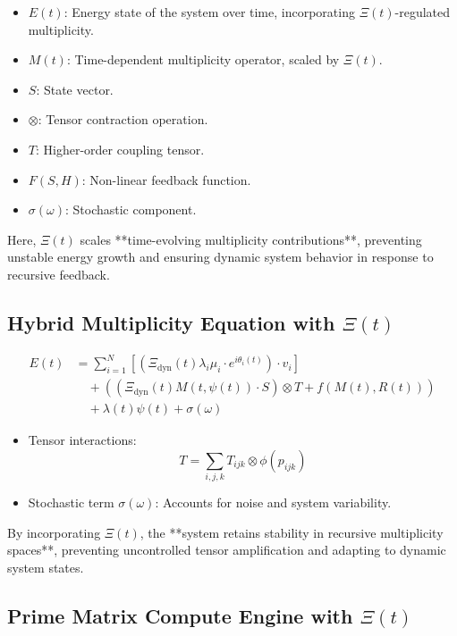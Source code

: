 \documentclass{article}
\theoremstyle{plain}
\begin{document}
\begin{itemize}
\begin{itemize}
    \item \textbf{\( E(t) \)}: Energy state of the system over time, incorporating \(\Xi(t) \)-regulated multiplicity.
    \item \textbf{\( M(t) \)}: Time-dependent multiplicity operator, scaled by \(\Xi(t) \).
    \item \textbf{\( S \)}: State vector.
    \item \textbf{\( \otimes \)}: Tensor contraction operation.
    \item \textbf{\( T \)}: Higher-order coupling tensor.
    \item \textbf{\( F(S, H) \)}: Non-linear feedback function.
    \item \textbf{\( \sigma(\omega) \)}: Stochastic component.
\end{itemize}

Here, \(\Xi(t) \) scales **time-evolving multiplicity contributions**, preventing unstable energy growth and ensuring dynamic system behavior in response to recursive feedback.

\subsection{Hybrid Multiplicity Equation with \(\Xi(t) \)}

\begin{align}
E(t) &= \sum_{i=1}^N \left[ \left( \Xi_{\text{dyn}}(t) \lambda_i \mu_i \cdot e^{i\theta_i(t)} \right) \cdot v_i \right] \nonumber \\
&\quad + \left( (\Xi_{\text{dyn}}(t) M(t, \psi(t)) \cdot S) \otimes T + f(M(t), R(t)) \right) \nonumber \\
&\quad + \lambda(t)\psi(t) + \sigma(\omega)
\end{align}

\begin{itemize}
    \item Tensor interactions:
    \[
    T = \sum_{i,j,k} T_{ijk} \otimes \phi(p_{ijk})
    \]
    \item Stochastic term \( \sigma(\omega) \): Accounts for noise and system variability.
\end{itemize}

By incorporating \(\Xi(t) \), the **system retains stability in recursive multiplicity spaces**, preventing uncontrolled tensor amplification and adapting to dynamic system states.

\subsection{Prime Matrix Compute Engine with \(\Xi(t) \)}


\end{itemize}
\end{document}

